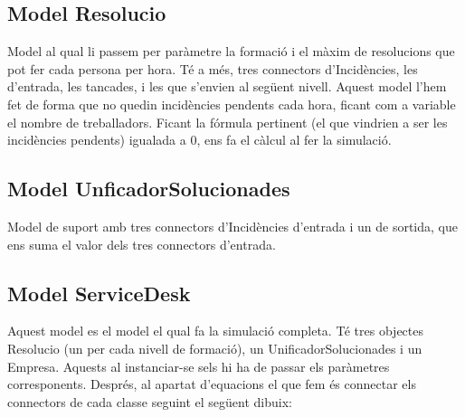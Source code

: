 \documentclass[11pt,a4paper,twoside]{report}
\begin{document}
\subsection{Model Resolucio}



Model al qual li passem per paràmetre la formació i el màxim de resolucions que pot fer cada persona per hora. Té a més, tres connectors d'Incidències, les d'entrada, les tancades, i les que s'envien al següent nivell.
Aquest model l'hem fet de forma que no quedin incidències pendents cada hora, ficant com a variable el nombre de treballadors. 
Ficant la fórmula pertinent (el que vindrien a ser les incidències pendents) igualada a 0, ens fa el càlcul al fer la simulació.

\subsection{Model UnficadorSolucionades}


Model de suport amb tres connectors d'Incidències d'entrada i un de sortida, que ens suma el valor dels tres connectors d'entrada.

\subsection{Model ServiceDesk}


Aquest model es el model el qual fa la simulació completa. Té tres objectes Resolucio (un per cada nivell de formació), un UnificadorSolucionades i un Empresa. 
Aquests al instanciar-se sels hi ha de passar els paràmetres corresponents. Després, al apartat d'equacions el que fem és connectar els connectors de cada classe seguint el següent dibuix:
\end{document}
